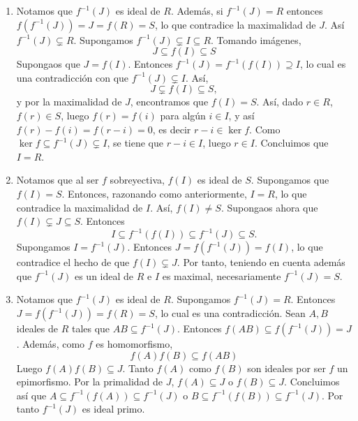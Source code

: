 \documentclass[11pt]{book}
\theoremstyle{definition}
\begin{document}
\begin{enumerate}
    \item Notamos que $f^{-1}(J)$ es ideal de $R$. Además, si $f^{-1}(J)=R$ entonces $f(f^{-1}(J))=J=f(R)=S$, lo que contradice la maximalidad de $J$. Así $f^{-1}(J)\subsetneq R$. Supongamos $f^{-1}(J)\subsetneq I\subseteq R$. Tomando imágenes,\[
    J\subseteq f(I)\subseteq S
    \]Supongaos que $J=f(I)$. Entonces $f^{-1}(J)=f^{-1}(f(I))\supseteq I$, lo cual es una contradicción con que $f^{-1}(J)\subsetneq I$. Así,\[
        J\subsetneq f(I)\subseteq S,
    \]y por la maximalidad de $J$, encontramos que $f(I)=S$. Así, dado $r\in R$, $f(r)\in S$, luego $f(r)=f(i)$ para algún $i\in I$, y así $f(r)-f(i)=f(r-i)=0$, es decir $r-i\in \ker f$. Como $\ker f\subseteq f^{-1}(J)\subsetneq I$, se tiene que $r-i\in I$, luego $r\in I$. Concluimos que $I=R$.

    \item Notamos que al ser $f$ sobreyectiva, $f(I)$ es ideal de $S$. Supongamos que $f(I)=S$. Entonces, razonando como anteriormente, $I=R$, lo que contradice la maximalidad de $I$. Así, $f(I)\neq S$. Supongaos ahora que $f(I)\subsetneq J\subseteq S$. Entonces\[
    I\subseteq f^{-1}(f(I))\subseteq f^{-1}(J)\subseteq S.
    \]Supongamos $I=f^{-1}(J)$. Entonces $J=f(f^{-1}(J))=f(I)$, lo que contradice el hecho de que $f(I)\subsetneq J$. Por tanto, teniendo en cuenta además que $f^{-1}(J)$ es un ideal de $R$ e $I$ es maximal, necesariamente $f^{-1}(J)=S$.

    \item Notamos que $f^{-1}(J)$ es ideal de $R$. Supongamos $f^{-1}(J)=R$. Entonces $J=f(f^{-1}(J))=f(R)=S$, lo cual es una contradicción. Sean $A,B$ ideales de $R$ tales que $AB\subseteq f^{-1}(J)$. Entonces $f(AB)\subseteq f(f^{-1}(J))=J$. Además, como $f$ es homomorfismo,\[
    f(A)f(B)\subseteq f(AB)
    \]Luego $f(A)f(B)\subseteq J$. Tanto $f(A)$ como $f(B)$ son ideales por ser $f$ un epimorfismo. Por la primalidad de $J$, $f(A)\subseteq J$ o $f(B)\subseteq J$. Concluimos así que $A\subseteq f^{-1}(f(A))\subseteq f^{-1}(J)$ o $B\subseteq f^{-1}(f(B))\subseteq f^{-1}(J)$. Por tanto $f^{-1}(J)$ es ideal primo.


\end{enumerate}
\end{document}
